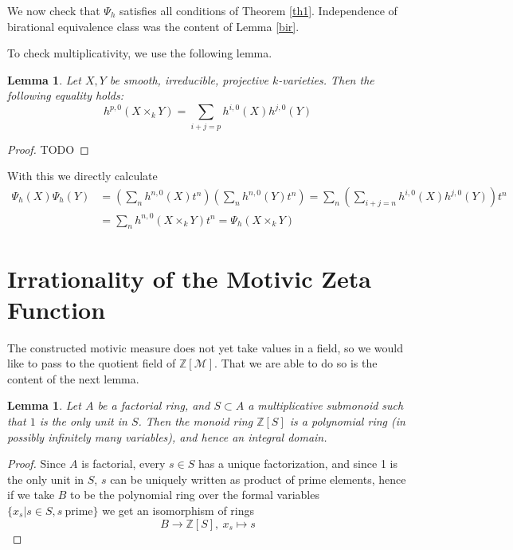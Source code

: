 \documentclass[11pt, a4paper, german]{article}
\theoremstyle{plain}
\newtheorem{lemma}[theorem]{Lemma}
\theoremstyle{definition}
\begin{document}
We now check that $\Psi_h$ satisfies all conditions of Theorem \ref{th1}. Independence of birational equivalence class was the content of Lemma
\ref{bir}. 

To check multiplicativity, we use the following lemma.

\begin{lemma}
    Let $X,Y$ be smooth, irreducible, projective $k$-varieties. Then the following equality holds:
    \[
        h^{p,0}(X \times_k Y) = \sum_{i+j=p} h^{i,0}(X)h^{j,0}(Y)
    \]
\end{lemma}
\begin{proof} TODO \end{proof}

With this we directly calculate 
\begin{align*}
    \Psi_h(X)\Psi_h(Y) &= \left( \sum_n h^{n,0}(X)t^n \right) \left( \sum_n h^{n,0}(Y)t^n \right)  
    = \sum_n \left( \sum_{i+j=n} h^{i,0}(X) h^{j,0}(Y) \right )t^n \\ &= \sum_n h^{n,0}(X \times_k Y)t^n = \Psi_h(X \times_k Y)
\end{align*}


\section{Irrationality of the Motivic Zeta Function}
\label{final}
The constructed motivic measure does not yet take values in a field, so we would like to pass to the quotient field of $\mathbb{Z}[\mathcal{M}]$.
That we are able to do so is the content of the next lemma.

\begin{lemma}
    Let $A$ be a factorial ring, and $S \subset A$ a multiplicative submonoid such that $1$ is the only unit in $S$. Then the monoid ring
    $\mathbb{Z}[S]$ is a polynomial ring (in possibly infinitely many variables), and hence an integral domain.
\end{lemma}
\begin{proof}
    Since $A$ is factorial, every $s \in S$ has a unique factorization, and since 1 is the only unit in $S$, 
    $s$ can be uniquely written as product of prime elements, hence if we take $B$ to be the polynomial ring over the formal
    variables $\{x_s | s \in S, s\ \text{prime}\}$ we get an isomorphism of rings
    \[
        B \to \mathbb{Z}[S], \ x_s \mapsto s
    \]
\end{proof}
\end{document}

